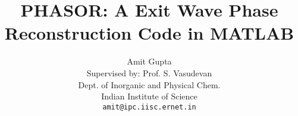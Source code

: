 \documentclass[12pt]{scrartcl}
\title{PHASOR: A Exit Wave Phase Reconstruction Code in MATLAB\textsuperscript{\textregistered}}
\author{Amit Gupta\\{Supervised by: Prof. S. Vasudevan}\\Dept. of Inorganic and Physical Chem.\\Indian Institute of Science\\\texttt{amit@ipc.iisc.ernet.in}}
\date{}
\begin{document}
    
    {\Huge{\maketitle}}
    \newpage
    
    
    
    
    
\end{document}
